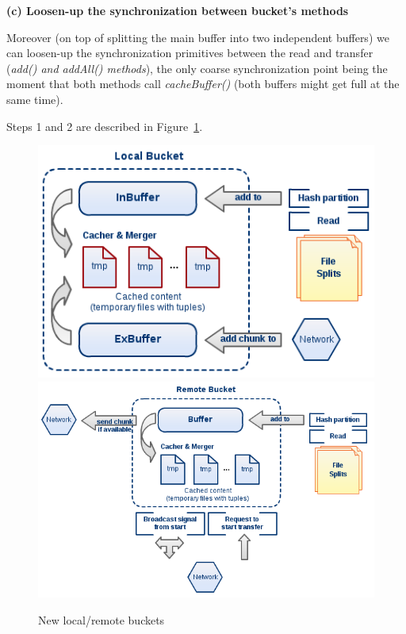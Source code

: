 \textbf{(c) Loosen-up the synchronization between bucket's methods}

Moreover (on top of splitting the main buffer into two independent buffers) we can loosen-up the synchronization primitives between the read and transfer (\textit{add() and addAll() methods}), the only coarse synchronization point being the moment that both methods call \textit{cacheBuffer()} (both buffers might get full at the same time).

Steps 1 and 2 are described in Figure~\ref{fig:diag4}.

\pagebreak

\begin{figure}
\centering
\includegraphics[scale=0.6]{diag4a}
\linebreak
\linebreak
\centering
\includegraphics[scale=0.6]{diag4b}
\caption{New local/remote buckets}
\label{fig:diag4}
\end{figure}

